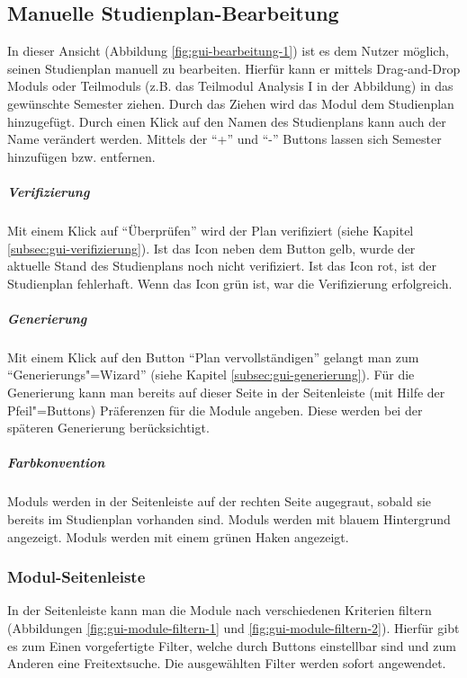 \subsection{Manuelle Studienplan-Bearbeitung}
\label{subsec:gui-manuelle-bearbeitung}
In dieser Ansicht (Abbildung \ref{fig:gui-bearbeitung-1}) ist es dem Nutzer möglich, seinen \gls{Studienplan} manuell zu bearbeiten. Hierfür kann er mittels \gls{Drag-and-Drop} \glspl{Modul} oder \glspl{Teilmodul} (z.B. das \gls{Teilmodul} Analysis I in der Abbildung) in das gewünschte Semester ziehen. Durch das Ziehen wird das \gls{Modul} dem \gls{Studienplan} hinzugefügt. Durch einen Klick auf den Namen des \gls{Studienplan}s kann auch der Name verändert werden. Mittels der \enquote{+} und \enquote{-} Buttons lassen sich Semester hinzufügen bzw. entfernen.
\subparagraph{Verifizierung}
Mit einem Klick auf \enquote{Überprüfen} wird der Plan verifiziert (siehe Kapitel \ref{subsec:gui-verifizierung}).\newline
Ist das Icon neben dem Button gelb, wurde der aktuelle Stand des \gls{Studienplan}s noch nicht verifiziert. Ist das Icon rot, ist der \gls{Studienplan} fehlerhaft. Wenn das Icon grün ist, war die Verifizierung erfolgreich.
\subparagraph{Generierung}
Mit einem Klick auf den Button \enquote{Plan vervollständigen} gelangt man zum \enquote{Generierungs"=Wizard} (siehe Kapitel \ref{subsec:gui-generierung}). Für die Generierung kann man bereits auf dieser Seite in der Seitenleiste (mit Hilfe der Pfeil"=Buttons) Präferenzen für die Module angeben. Diese werden bei der späteren Generierung berücksichtigt.
\subparagraph{Farbkonvention}
\glspl{Modul} werden in der Seitenleiste auf der rechten Seite augegraut, sobald sie bereits im \gls{Studienplan} vorhanden sind.\newline
{} \glspl{Modul} werden mit blauem Hintergrund angezeigt.
 \glspl{Modul} werden mit einem grünen Haken angezeigt.


\subsubsection{Modul-Seitenleiste}
\label{subsec:gui-modul-sidebar}
In der Seitenleiste kann man die Module nach verschiedenen Kriterien filtern (Abbildungen \ref{fig:gui-module-filtern-1} und \ref{fig:gui-module-filtern-2}). Hierfür gibt es zum Einen vorgefertigte Filter, welche durch Buttons einstellbar sind und zum Anderen eine Freitextsuche. Die ausgewählten Filter werden sofort angewendet.


